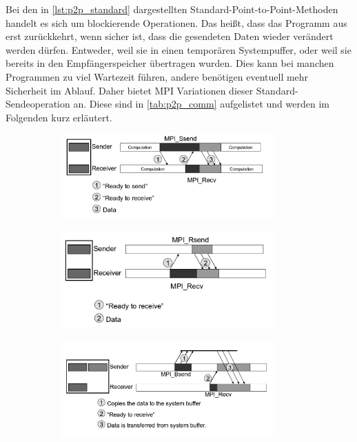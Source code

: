     Bei den in \autoref{lst:p2p_standard} dargestellten Standard-Point-to-Point-Methoden handelt es sich um blockierende Operationen. Das heißt, dass das Programm aus  
    erst zurückkehrt, wenn sicher ist, dass die gesendeten Daten wieder verändert werden dürfen. Entweder, weil sie in einen temporären Systempuffer, oder weil sie bereits in den 
    Empfängerspeicher übertragen wurden.
    Dies kann bei manchen Programmen zu viel Wartezeit führen, andere benötigen eventuell mehr Sicherheit im Ablauf. Daher bietet MPI Variationen dieser Standard-Sendeoperation an. 
    Diese sind in \autoref{tab:p2p_comm} aufgelistet und werden im Folgenden kurz erläutert.
    
    \begin{figure}[t]
      \begin{subfigure}[c]{0.53\textwidth}
	\includegraphics[width=0.9\textwidth]{img/SyncSend_gray.png}
	\label{fig:sync_send}
      \end{subfigure}
      \begin{subfigure}[c]{0.45\textwidth}
	\includegraphics[width=0.9\textwidth]{img/ReadySend_gray.png}
	\label{fig:ready_send}
      \end{subfigure}
      \begin{subfigure}[c]{0.5\textwidth}
	\includegraphics[width=0.9\textwidth]{img/BufferedSend_gray.png}

\end{subfigure}
\end{figure}

